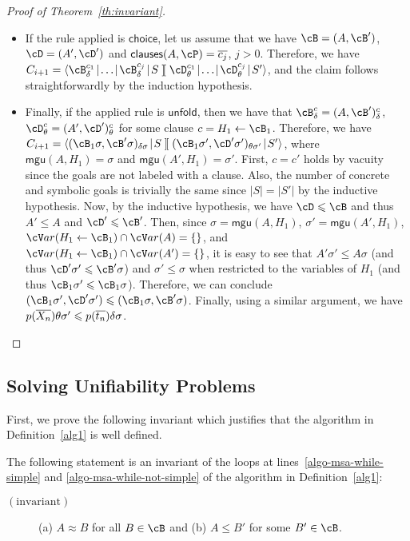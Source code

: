 \documentclass[fleqn]{tlp}
\newcommand{\sleq}{\leqslant}
\newcommand{\mgu}{\mathsf{mgu}}
\newcommand{\clauses}{\mathsf{clauses}}
\newcommand{\midd}{\!\mid\!}
\newcommand{\sep}{\mathit{\;]\![\;}}
\newcommand{\var}{{\cV}ar}
\def \tuple#1{\langle #1 \rangle}
\begin{document}
\begin{appendix}
\begin{proof}[Proof of Theorem~\ref{th:invariant}]
\begin{itemize}
  \item If the rule applied is $\mathsf{choice}$, let us assume that
    we have $\cB = (A,\cB')$, $\cD = (A',\cD')$ and $\clauses(A,\cP) =
    \ol{c_j}$, $j>0$. Therefore, we have $C_{i+1}=
    \tuple{\cB^{c_1}_\delta\midd\ldots\midd \cB^{c_j}_\delta\midd
      S\sep \cD^{c_1}_\theta\midd\ldots\midd \cD^{c_j}_\theta\midd
      S'}$, and the claim follows straightforwardly by the induction
    hypothesis.

  \item Finally, if the applied rule is $\mathsf{unfold}$, then we
    have that $\cB^c_\delta = (A,\cB')^c_\delta$, $\cD^c_\theta =
    (A',\cD')^c_\theta$ for some clause $c =
    H_1\leftarrow\cB_1$. Therefore, we have $C_{i+1} =
    \tuple{(\cB_1\sigma,\cB'\sigma)_{\delta\sigma}\midd S\sep
      (\cB_1\sigma',\cD'\sigma')_{\theta\sigma'}\midd S'}$, where
    $\mgu(A,H_1)=\sigma$ and $\mgu(A',H_1) = \sigma'$. First, $c=c'$
    holds by vacuity since the goals are not labeled with a
    clause. Also, the number of concrete and symbolic goals is
    trivially the same since $|S|=|S'|$ by the inductive hypothesis.
    Now, by the inductive hypothesis, we have $\cD\sleq\cB$ and thus
    $A'\sleq A$ and $\cD'\sleq\cB'$. Then, since $\sigma=\mgu(A,H_1)$,
    $\sigma'=\mgu(A',H_1)$, $\var(H_1\leftarrow
    \cB_1)\cap\var(A)=\emptyset$, and $\var(H_1\leftarrow
    \cB_1)\cap\var(A')=\emptyset$, it is easy to see that
    $A'\sigma'\sleq A\sigma$ (and thus $\cD'\sigma'\sleq\cB'\sigma$)
    and $\sigma'\sleq \sigma$ when restricted to the variables of $H_1$ 
    (and thus $\cB_1\sigma'\sleq
    \cB_1\sigma$). Therefore, we can conclude
    $(\cB_1\sigma',\cD'\sigma')\sleq (\cB_1\sigma,\cB'\sigma)$.
    Finally, using a similar argument, we have
    $p(\ol{X_n})\theta\sigma'\sleq p(\ol{t_n})\delta\sigma$.
  \end{itemize}
\end{proof}

\subsection{Solving Unifiability Problems}

First, we prove the following invariant which justifies that the
algorithm in Definition~\ref{alg1} is well defined.

\begin{proposition}
  The following statement is an invariant of the loops at
  lines~\ref{algo-msa-while-simple} and
  \ref{algo-msa-while-not-simple} of the algorithm in
  Definition~\ref{alg1}:
  \begin{description}
  \item[$\mathrm{(invariant)}$] (a) $A\approx B$ for all $B\in \cB$
    and (b) $A\leq B'$ for some $B'\in\cB$.
  \end{description}
\end{proposition}


\end{appendix}
\end{document}
